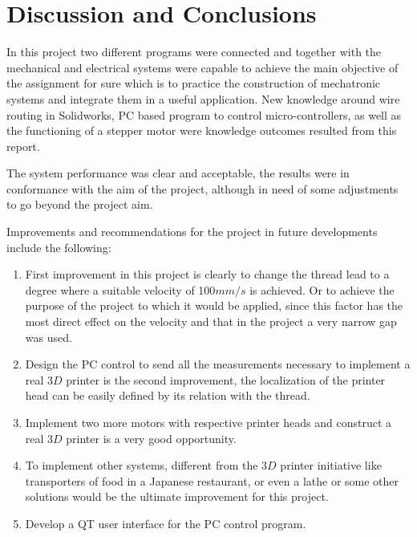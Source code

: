 \documentclass[transmag]{IEEEtran}
\begin{document}
\section{Discussion and Conclusions}

In this project two different programs were connected and together with the mechanical and electrical systems were capable to achieve the main objective of the assignment for sure which is to practice the construction of mechatronic systems and integrate them in a useful application.
New knowledge around wire routing in Solidworks, PC based program to control micro-controllers, as well as the functioning of a stepper motor were knowledge outcomes resulted from this report.

The system performance was clear and acceptable, the results were in conformance with the aim of the project, although in need of some adjustments to go beyond the project aim.  

Improvements and recommendations for the project in future developments include the following:


\begin{enumerate}
\item First improvement in this project is clearly to change the thread lead to a degree where a suitable velocity of 100$mm/s$ is achieved. Or to achieve the purpose of the project to which it would be applied, since this factor has the most direct effect on the velocity and that in the project a very narrow gap was used.
\item Design the PC control to send all the measurements necessary to implement a real $3D$ printer is the second improvement, the localization of the printer head can be easily defined by its relation with the thread. 
\item Implement two more motors with respective printer heads and construct a real $3D$ printer is a very good opportunity.
\item To implement other systems, different from the $3D$ printer initiative like transporters of food in a Japanese restaurant, or even a lathe or some other solutions would be the ultimate improvement for this project.
\item Develop a QT user interface for the PC control program.
\end{enumerate}






\clearpage
\newpage
\end{document}

